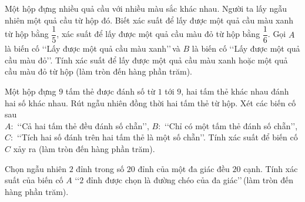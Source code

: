 \begin{ex}%
	Một hộp đựng nhiều quả cầu với nhiều màu sắc khác nhau. Người ta lấy ngẫu nhiên một quả cầu từ hộp đó. Biết xác suất để lấy được một quả cầu màu xanh từ hộp bằng $\dfrac{1}{5}$, xác suất để lấy được một quả cầu màu đỏ từ hộp bằng $\dfrac{1}{6}$. Gọi $A$ là biến cố \lq\lq Lấy được một quả cầu màu xanh\rq\rq\,và $B$ là biến cố \lq\lq Lấy được một quả cầu màu đỏ\rq\rq. Tính xác suất để lấy được một quả cầu màu xanh hoặc một quả cầu màu đỏ từ hộp (làm tròn đến hàng phần trăm).
\end{ex}

\begin{ex}%
	Một hộp đựng $9$ tấm thẻ được đánh số từ $1$ tới $9$, hai tấm thẻ khác nhau đánh hai số khác nhau. Rút ngẫu nhiên đồng thời hai tấm thẻ từ hộp. Xét các biến cố sau\\
	$A\colon$ \lq\lq Cả hai tấm thẻ đều đánh số chẵn\rq\rq, $B\colon$ \lq\lq Chỉ có một tấm thẻ đánh số chẵn\rq\rq, $C\colon$ \lq\lq Tích hai số đánh trên hai tấm thẻ là một số chẵn\rq\rq. Tính xác suất để biến cố $C$ xảy ra (làm tròn đến hàng phần trăm).
\end{ex}

\begin{ex}%
	Chọn ngẫu nhiên $2$ đỉnh trong số $20$ đỉnh của một đa giác đều $20$ cạnh. Tính xác suất của biến cố $A$ \lq\lq$2$ đỉnh được chọn là đường chéo của đa giác\rq\rq\,(làm tròn đến hàng phần trăm).
\end{ex}

